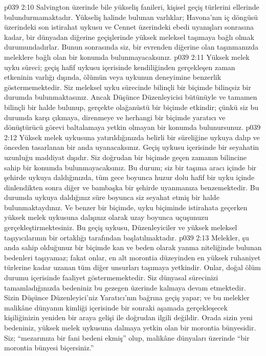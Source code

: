 \vs p039 2:10 Salvington üzerinde bile yükseliş fanileri, kişisel geçiş türlerini ellerinde bulundurmamaktadır. Yükseliş halinde bulunan varlıklar; Havona’nın iç döngüsü üzerindeki son istirahat uykusu ve Cennet üzerindeki ebedi uyanışları sonrasına kadar, bir dünyadan diğerine geçişlerinde yüksek meleksel taşımaya bağlı olmak durumundadırlar. Bunun sonrasında siz, bir evrenden diğerine olan taşınmanızda meleklere bağlı olan bir konumda bulunmayacaksınız.
\vs p039 2:11 Yüksek melek uyku süreci; geçiş hafif uykusu içerisinde kendiliğinden gerçekleşen zaman etkeninin varlığı dışında, ölümün veya uykunun deneyimine benzerlik göstermemektedir. Siz meleksel uyku sürecinde bilinçli bir biçimde bilinçsiz bir durumda bulunmaktasınız. Ancak Düşünce Düzenleyicisi bütünüyle ve tamamen bilinçli bir halde bulunup, gerçekte olağanüstü bir biçimde etkindir; çünkü siz bu durumda karşı çıkmaya, direnmeye ve herhangi bir biçimde yaratıcı ve dönüştürücü görevi baltalamaya yetkin olmayan bir konumda bulunursunuz.
\vs p039 2:12 Yüksek melek uykusuna yatırıldığınızda belirli bir süreliğine uykuya dalıp ve önceden tasarlanan bir anda uyanacaksınız. Geçiş uykusu içerisinde bir seyahatin uzunluğu maddiyat dışıdır. Siz doğrudan bir biçimde geçen zamanın bilincine sahip bir konumda bulunmayacaksınız. Bu durum; siz bir taşıma aracı içinde bir şehirde uykuya daldığınızda, tüm gece boyunca huzur dolu hafif bir uyku içinde dinlendikten sonra diğer ve bambaşka bir şehirde uyanmanıza benzemektedir. Bu durumda uykuya daldığınız süre boyunca siz seyahat etmiş bir halde bulunmaktaydınız. Ve benzer bir biçimde, uyku biçiminde istirahata geçerken yüksek melek uykusuna dalışınız olarak uzay boyunca uçuşunuzu gerçekleştirmektesiniz. Bu geçiş uykusu, Düzenleyiciler ve yüksek meleksel taşıyıcılarının bir ortaklığı tarafından başlatılmaktadır.
\vs p039 2:13 Melekler, şu anda sahip olduğunuz bir biçimde kan ve beden olarak yanma niteliğinde bulunan bedenleri taşıyamaz; fakat onlar, en alt morontia düzeyinden en yüksek ruhaniyet türlerine kadar uzanan tüm diğer unsurları taşımaya yetkindir. Onlar, doğal ölüm durumu içerisinde faaliyet göstermemektedir. Siz dünyasal sürecinizi tamamladığınızda bedeniniz bu gezegen üzerinde kalmaya devam etmektedir. Sizin Düşünce Düzenleyici’niz Yaratıcı’nın bağrına geçiş yapar; ve bu melekler malikâne dünyanın kimliği içerisinde bir sonraki aşamada gerçekleşecek kişiliğinizin yeniden bir araya gelişi ile doğrudan ilgili değildir. Orada sizin yeni bedeniniz, yüksek melek uykusuna dalmaya yetkin olan bir morontia bünyesidir. Siz; “mezarınıza bir fani bedeni ekmiş” olup, malikâne dünyaları üzerinde “bir morontia bünyesi biçersiniz.”
